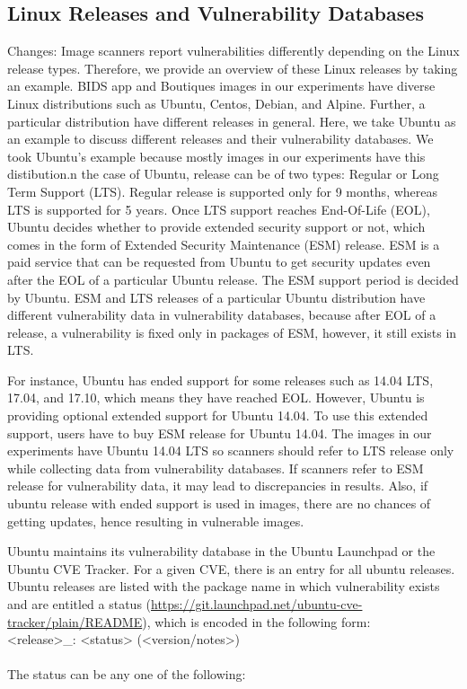 \documentclass[a4paper,num-refs]{oup-contemporary}
\newcommand{\change}[2]{\color{cyan}Changes: #1\color{black}}
\begin{document}
\subsection{Linux Releases and Vulnerability Databases}

\change{Image scanners report vulnerabilities differently depending on the Linux release types.
Therefore, we provide an overview of these Linux releases by taking an example. 
BIDS app and Boutiques images in our experiments have diverse Linux
distributions such as Ubuntu, Centos, Debian, and Alpine. Further, a particular
distribution have different releases in general. Here, we take Ubuntu as an example
to discuss different releases and their vulnerability databases. We took Ubuntu's example
because mostly images in our experiments have this distibution.} In the case of Ubuntu, release
can be of two types: Regular or Long Term Support (LTS).
Regular release is supported only for 9 months, whereas LTS is supported for 5 years. Once LTS support
reaches End-Of-Life (EOL), Ubuntu decides whether to provide extended security support or not, which comes
in the form of Extended Security Maintenance (ESM) release.
ESM is a paid service that can be requested from Ubuntu to get security 
updates even after the EOL of a particular Ubuntu release. The ESM support period is decided by
Ubuntu. ESM and LTS releases of a particular Ubuntu distribution have different vulnerability
data in vulnerability databases, because after EOL of a release, a vulnerability is fixed only in packages of ESM, however, it still
exists in LTS.

For instance, Ubuntu has ended support for some releases such as 14.04 LTS,
17.04, and 17.10, which means they have reached EOL. However, Ubuntu is providing optional extended support for Ubuntu 14.04.
To use this extended support, users have to buy ESM release for Ubuntu 14.04.
The images in our experiments have Ubuntu 14.04 LTS so scanners should refer
to LTS release only while collecting data from vulnerability databases. If scanners refer to ESM release for 
vulnerability data, it may lead to discrepancies in results.
Also, if ubuntu release with ended support is used in images, there are no chances of getting updates, hence
resulting in vulnerable images. 

Ubuntu maintains its vulnerability database in the Ubuntu Launchpad or the Ubuntu CVE Tracker. For a given CVE, there is an entry for all ubuntu releases.
Ubuntu releases are listed with the package name
in which vulnerability exists and are entitled a status
(\href{https://git.launchpad.net/ubuntu-cve-tracker/plain/README}{https://git.launchpad.net/ubuntu-cve-tracker/plain/README}), which is
encoded in the following form:
\newline \\
\noindent <release>\_<source-package>: <status> (<version/notes>) \\
\newline\\
The status can be any one of the following:
\end{document}
